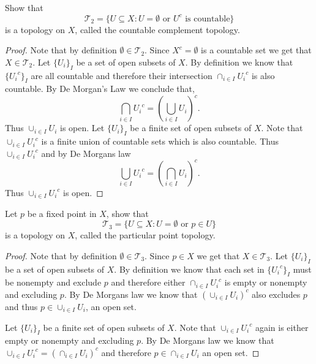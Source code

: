 \documentclass[minion]{homework651}
\begin{document}
\begin{problems}
\begin{subproblems}
    \item Show that 
     \begin{equation*}
        \mathcal{T}_{2} = \{ U \subseteq X: U = \emptyset \text{ or } U^c \text{ is countable}\}
    \end{equation*}
    is a topology on $X$, called the countable complement topology.
    \solution\begin{proof}
        Note that by definition $\emptyset \in \mathcal{T}_{2}$. Since $X^c = \emptyset$ is a countable set 
        we get that $X \in \mathcal{T}_{2}$. Let $\{U_i\}_I$ be a set of open subsets of $X$. By definition we know that 
        $\{{U_i}^c\}_I$ are all countable and therefore their intersection $\cap_{i \in I}{U_i}^c$ is also countable.
        By De Morgan's Law we conclude that, 
        \begin{equation*}
            \bigcap_{i \in I}{U_i}^c = \left(\bigcup_{i \in I} U_i\right)^c.
        \end{equation*}
        Thus $\cup_{i \in I} U_i$ is open. Let $\{U_i\}_I$ be a finite set of open subsets of $X$. Note that $\cup_{i \in I}{U_i}^c$
        is a finite union of countable sets which is also countable. Thus $\cup_{i \in I}{U_i}^c$ and by De Morgans law 
        \begin{equation*}
            \bigcup_{i \in I}{U_i}^c = \left(\bigcap_{i \in I} U_i\right)^c.
        \end{equation*}
        Thus $\cup_{i \in I}{U_i}^c$ is open. 
    \end{proof}

    \item Let $p$ be a fixed point in $X$, show that 
     \begin{equation*}
        \mathcal{T}_{3} = \{ U \subseteq X: U = \emptyset \text{ or } p \in U\}
    \end{equation*}
    is a topology on $X$, called the particular point topology.
    \solution\begin{proof}
        Note that by definition $\emptyset \in \mathcal{T}_{3}$. Since $p \in X$ we get that $X \in \mathcal{T}_{3}$. Let $\{U_i\}_I$ be a set of open subsets of $X$. By definition we know that each set in 
        $\{{U_i}^c\}_I$ must be nonempty and exclude $p$ and therefore either $\cap_{i \in I} {U_i}^c$ is empty or nonempty and excluding $p$. By De Morgans law we know that $(\cup_{i \in I} {U_i})^c$ also excludes $p$ and thus $p \in \cup_{i \in I} {U_i}$, an open set. 
        
        Let $\{U_i\}_I$ be a finite set of open subsets of $X$. Note that $\cup_{i \in I}{U_i}^c$ again is either empty or nonempty and excluding $p$. By De Morgans law we know that $\cup_{i \in I}{U_i}^c = (\cap_{i \in I}{U_i})^c$ and therefore $p \in \cap_{i \in I}{U_i}$ an open set. 
    \end{proof}


\end{subproblems}
\end{problems}
\end{document}
